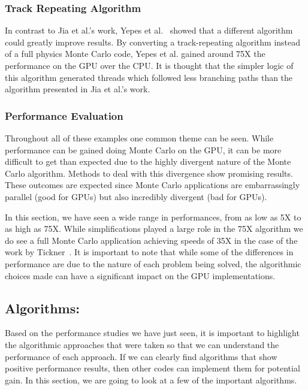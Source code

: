 \subsubsection*{\textbf{Track Repeating Algorithm}}
In contrast to Jia et al.'s work, Yepes et al.~\cite{yepes2010gpu} showed that a different algorithm could greatly improve results.
%
By converting a track-repeating algorithm instead of a full physics Monte Carlo code, Yepes et al. gained around 75X the performance on the GPU over the CPU.
%
It is thought that the simpler logic of this algorithm generated threads which followed less branching paths than the algorithm presented in Jia et al.'s work.

\subsubsection*{\textbf{Performance Evaluation}}
Throughout all of these examples one common theme can be seen.
%
While performance can be gained doing Monte Carlo on the GPU, it can be more difficult to get than expected due to the highly divergent nature of the Monte Carlo algorithm.
%
Methods to deal with this divergence show promising results.
%
These outcomes are expected since Monte Carlo applications are embarrassingly parallel (good for GPUs) but also incredibly divergent (bad for GPUs).
%

In this section, we have seen a wide range in performances, from as low as 5X to as high as 75X.
%
While simplifications played a large role in the 75X algorithm we do see a full Monte Carlo application achieving speeds of 35X in the case of the work by Tickner~\cite{tickner2010monte}.
%
It is important to note that while some of the differences in performance are due to the nature of each problem being solved, the algorithmic choices made can have a significant impact on the GPU implementations.
%

\subsection*{\textbf{Algorithms:}}

Based on the performance studies we have just seen, it is important to highlight the algorithmic approaches that were taken so that we can understand the performance of each approach.
%
If we can clearly find algorithms that show positive performance results, then other codes can implement them for potential gain.
%
In this section, we are going to look at a few of the important algorithms.
%

